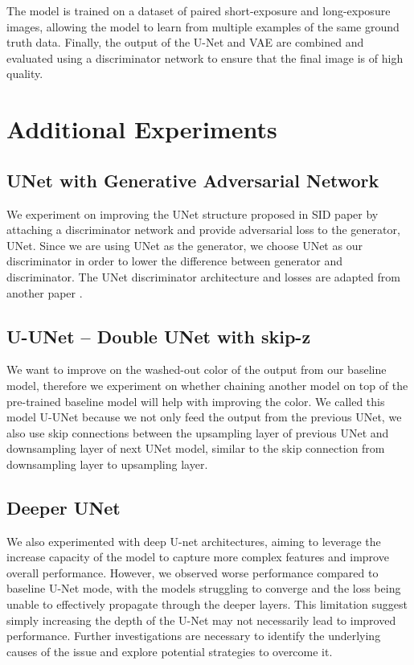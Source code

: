 \documentclass{article}
\begin{document}
The model is trained on a dataset of paired short-exposure and long-exposure images, allowing the model to learn from multiple examples of the same ground truth data. Finally, the output of the U-Net and VAE are combined and evaluated using a discriminator network to ensure that the final image is of high quality.
\section{Additional Experiments}
\subsection{UNet with Generative Adversarial Network}
We experiment on improving the UNet structure proposed in SID paper \cite{LearningToSeeInTheDark} by attaching a discriminator network and provide adversarial loss to the generator, UNet. Since we are using UNet as the generator, we choose UNet as our discriminator in order to lower the difference between generator and discriminator. The UNet discriminator architecture and losses are adapted from another paper \cite{unetd}. %
\subsection{U-UNet -- Double UNet with skip-z}
We want to improve on the washed-out color of the output from our baseline model, therefore we experiment on whether chaining another model on top of the pre-trained baseline model will help with improving the color. We called this model U-UNet because we not only feed the output from the previous UNet, we also use skip connections between the upsampling layer of previous UNet and downsampling layer of next UNet model, similar to the skip connection from downsampling layer to upsampling layer. 
\subsection{Deeper UNet}
We also experimented with deep U-net architectures, aiming to leverage the increase capacity of the model to capture more complex features and improve overall performance. However, we observed worse performance compared to baseline U-Net mode, with the models struggling to converge and the loss being unable to effectively propagate through the deeper layers. This limitation suggest simply increasing the depth of the U-Net may not necessarily lead to improved performance. Further investigations are necessary to identify the underlying causes of the issue and explore potential strategies to overcome it. 
\end{document}
